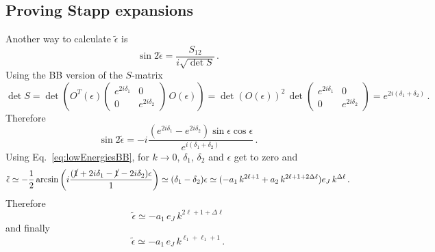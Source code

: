 \documentclass[10pt,a4paper]{article}
\newcommand{\eq}[1]{Eq.~#1}
\begin{document}
	\begin{appendices}
	\newcommand{\teps}{\tilde{\epsilon}}
	\newcommand{\tdone}{\tilde{\delta}_1}
	\newcommand{\tdtwo}{\tilde{\delta}_2}
	\section{Proving Stapp expansions}
		Another way to calculate $\tilde{\epsilon}$ is 
		\begin{equation}
			\sin2\teps = 
			\frac{S_{12}}{i\sqrt{\det S}}\,.
		\end{equation}	
		Using the BB version of the $S$-matrix
		\begin{equation}
			\det S = \det\left(O^T(\epsilon)
			\begin{pmatrix}
				e^{2i\delta_1} & 0 \\
				0 & e^{2i\delta_2}
			\end{pmatrix}\,
			O(\epsilon)
			\right)
			=
			\det\left(O(\epsilon)\right)^2\,
			\det\begin{pmatrix}
				e^{2i\delta_1} & 0 \\
				0 & e^{2i\delta_2}
			\end{pmatrix}
			=
			e^{2i(\delta_1+\delta_2)}\,.
		\end{equation}
		Therefore
		\begin{equation}
			\sin2\teps = 
			-i\frac{(e^{2i\delta_1}-e^{2i\delta_2})\sin\epsilon\cos\epsilon}{e^{i(\delta_1+\delta_2)}}\,.
		\end{equation}	
		Using \eq{\eqref{eq:lowEnergiesBB}}, for $k\rightarrow 0$, $\delta_1$, $\delta_2$ and $\epsilon$ get to zero and
		\begin{equation}
			\teps \simeq -\frac{1}{2}\arcsin\left(
			i\frac{(\cancel{1}+2i\delta_1-\cancel{1}-2i\delta_2)\epsilon}{1}
			\right)
			\simeq
			(\delta_1-\delta_2)\epsilon
			\simeq 
			(-a_1\,k^{2\ell+1}+a_2\,k^{2\ell+1+2\Delta\ell})e_J\,k^{\Delta\ell}\,.
		\end{equation}
		Therefore
		\begin{equation}
			\teps \simeq -a_1\,e_J\,k^{2\ell+1+\Delta\ell}
		\end{equation}
		and finally
		\begin{equation}
			\teps \simeq -a_1 \,e_J\,k^{\ell_1+\ell_1+1}\,.
			\label{eq:tildeepsilon}
		\end{equation}
		

\end{appendices}
\end{document}
